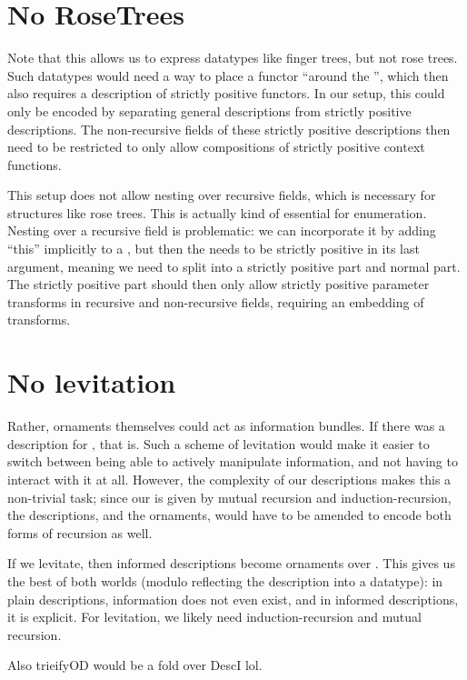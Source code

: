 \section{No RoseTrees}
\begin{outline}    
    Note that this allows us to express datatypes like finger trees, but not rose trees. Such datatypes would need a way to place a functor ``around the '', which then also requires a description of strictly positive functors. In our setup, this could only be encoded by separating general descriptions from strictly positive descriptions. The non-recursive fields of these strictly positive descriptions then need to be restricted to only allow compositions of strictly positive context functions. 
    
    This setup does not allow nesting over recursive fields, which is necessary for structures like rose trees. This is actually kind of essential for enumeration. Nesting over a recursive field is problematic: we can incorporate it by adding ``this'' implicitly to a , but then the  needs to be strictly positive in its last argument, meaning we need to split  into a strictly positive part and normal part. The strictly positive part should then only allow strictly positive parameter transforms in recursive and non-recursive fields, requiring an embedding of transforms.
\end{outline}


\section{No levitation}
\begin{outline}    
    Rather, ornaments themselves could act as information bundles. If there was a description for , that is. Such a scheme of levitation would make it easier to switch between being able to actively manipulate information, and not having to interact with it at all. However, the complexity of our descriptions makes this a non-trivial task; since our  is given by mutual recursion and induction-recursion, the descriptions, and the ornaments, would have to be amended to encode both forms of recursion as well. 
    
    If we levitate, then informed descriptions become ornaments over . This gives us the best of both worlds (modulo reflecting the description into a datatype): in plain descriptions, information does not even exist, and in informed descriptions, it is explicit. For levitation, we likely need induction-recursion and mutual recursion.

    Also trieifyOD would be a fold over DescI lol. 
\end{outline}

